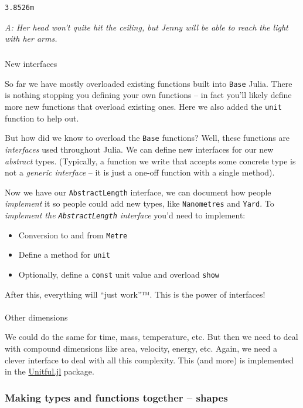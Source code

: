 \documentclass[
]{article}
\makeatletter
\let\oldparagraph\paragraph
\renewcommand{\paragraph}{
    \@ifstar
      \xxxParagraphStar
      \xxxParagraphNoStar
  }
\newcommand{\xxxParagraphStar}[1]{\oldparagraph*{#1}\mbox{}}
\newcommand{\xxxParagraphNoStar}[1]{\oldparagraph{#1}\mbox{}}
\let\oldsubparagraph\subparagraph
\renewcommand{\subparagraph}{
    \@ifstar
      \xxxSubParagraphStar
      \xxxSubParagraphNoStar
  }
\newcommand{\xxxSubParagraphStar}[1]{\oldsubparagraph*{#1}\mbox{}}
\newcommand{\xxxSubParagraphNoStar}[1]{\oldsubparagraph{#1}\mbox{}}
\providecommand{\tightlist}{%
  \setlength{\itemsep}{0pt}\setlength{\parskip}{0pt}}
\makeatother
\begin{document}
\begin{verbatim}
3.8526m
\end{verbatim}

\emph{A: Her head won't quite hit the ceiling, but Jenny will be able to
reach the light with her arms.}

\subparagraph{New interfaces}\label{new-interfaces}

So far we have mostly overloaded existing functions built into
\texttt{Base} Julia. There is nothing stopping you defining your own
functions -- in fact you'll likely define more new functions that
overload existing ones. Here we also added the \texttt{unit} function to
help out.

But how did we know to overload the \texttt{Base} functions? Well, these
functions are \emph{interfaces} used throughout Julia. We can define new
interfaces for our new \emph{abstract} types. (Typically, a function we
write that accepts some concrete type is not a \emph{generic interface}
-- it is just a one-off function with a single method).

Now we have our \texttt{AbstractLength} interface, we can document how
people \emph{implement} it so people could add new types, like
\texttt{Nanometres} and \texttt{Yard}. To \emph{implement the
\texttt{AbstractLength} interface} you'd need to implement:

\begin{itemize}
\tightlist
\item
  Conversion to and from \texttt{Metre}
\item
  Define a method for \texttt{unit}
\item
  Optionally, define a \texttt{const} unit value and overload
  \texttt{show}
\end{itemize}

After this, everything will ``just work''™. This is the power of
interfaces!

\paragraph{Other dimensions}\label{other-dimensions}

We could do the same for time, mass, temperature, etc. But then we need
to deal with compound dimensions like area, velocity, energy, etc.
Again, we need a clever interface to deal with all this complexity. This
(and more) is implemented in the
\href{https://painterqubits.github.io/Unitful.jl/stable/}{Unitful.jl}
package.

\subsubsection{Making types and functions together --
shapes}\label{making-types-and-functions-together-shapes}
\end{document}
